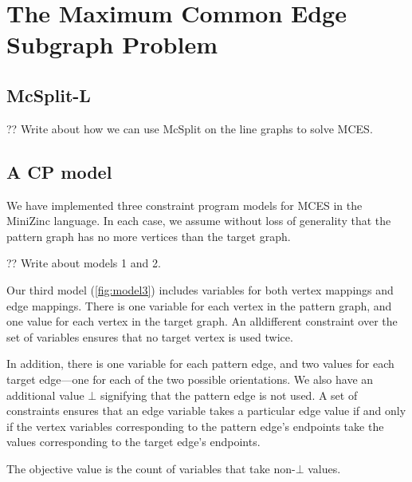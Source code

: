 \chapter{The Maximum Common Edge Subgraph Problem}
\label{c:mcsplite}

\section{McSplit-L}

?? Write about how we can use McSplit on the line graphs to solve MCES.

\section{A CP model}

We have implemented three constraint program models for MCES in the MiniZinc language.
In each case, we assume without loss of generality that the pattern graph has no more vertices than the target graph.

?? Write about models 1 and 2.

Our third model (\cref{fig:model3}) includes variables for both vertex mappings and edge mappings.
There is one variable for each vertex in the pattern graph, and one value
for each vertex in the target graph.  An alldifferent constraint over the set of variables ensures
that no target vertex is used twice.  

In addition, there is one variable for each pattern edge, and two values for
each target edge---one for each of the two possible orientations.  We also have
an additional value $\bot$ signifying that the pattern edge is not used.  A set
of constraints ensures that an edge variable takes a particular edge value if
and only if the vertex variables corresponding to the pattern edge's endpoints
take the values corresponding to the target edge's endpoints.

The objective value is the count of variables that take non-$\bot$ values.


